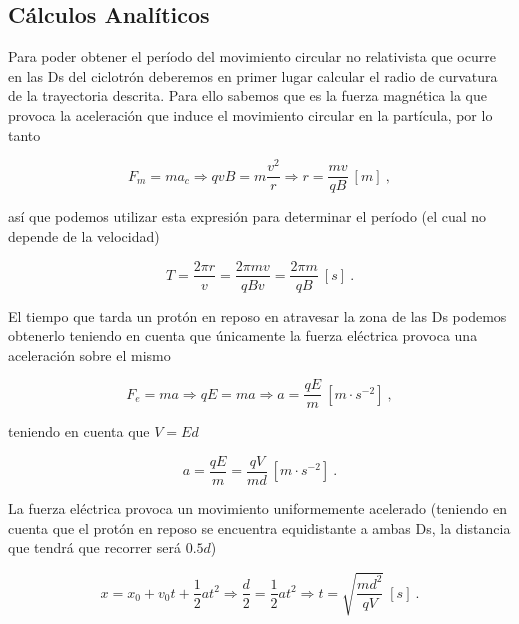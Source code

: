 \documentclass[journal]{IEEEtran}
\begin{document}
\newpage

\subsection{Cálculos Analíticos}

Para poder obtener el período del movimiento circular no relativista que ocurre en las Ds del ciclotrón deberemos en primer lugar calcular el radio de curvatura de la trayectoria descrita. Para ello sabemos que es la fuerza magnética la que provoca la aceleración que induce el movimiento circular en la partícula, por lo tanto

\begin{equation}
F_m = ma_c \Rightarrow qvB = m \displaystyle\frac{v^2}{r} \Rightarrow r = \displaystyle\frac{mv}{qB}~[m]~,
\end{equation}

así que podemos utilizar esta expresión para determinar el período (el cual no depende de la velocidad)

\begin{equation}
T = \displaystyle\frac{2\pi r}{v} = \displaystyle\frac{2\pi mv}{qBv} = \displaystyle\frac{2\pi m}{qB}~[s]~.
\end{equation}

El tiempo que tarda un protón en reposo en atravesar la zona de las Ds podemos obtenerlo teniendo en cuenta que únicamente la fuerza eléctrica provoca una aceleración sobre el mismo

\begin{equation}
F_e = ma \Rightarrow qE = ma \Rightarrow a = \displaystyle\frac{qE}{m}~[m\cdot s^{-2}]~,
\end{equation}

teniendo en cuenta que $V = Ed$

\begin{equation}
a = \displaystyle\frac{qE}{m} = \displaystyle\frac{qV}{md}~[m\cdot s^{-2}]~.
\end{equation}

La fuerza eléctrica provoca un movimiento uniformemente acelerado (teniendo en cuenta que el protón en reposo se encuentra equidistante a ambas Ds, la distancia que tendrá que recorrer será $0.5d$)

\begin{equation}
x = x_0 + v_0t + \displaystyle\frac{1}{2}at^2 \Rightarrow \displaystyle\frac{d}{2} = \displaystyle\frac{1}{2}at^2 \Rightarrow t = \sqrt{\displaystyle\frac{md^2}{qV}}~[s]~.
\end{equation}
\end{document}
